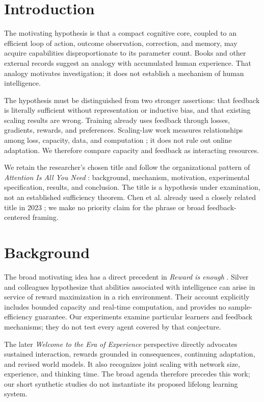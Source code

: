 \documentclass[11pt]{article}
\begin{document}
\section{Introduction}
The motivating hypothesis is that a compact cognitive core, coupled to an
efficient loop of action, outcome observation, correction, and memory, may
acquire capabilities disproportionate to its parameter count. Books and other
external records suggest an analogy with accumulated human experience. That
analogy motivates investigation; it does not establish a mechanism of human
intelligence.

The hypothesis must be distinguished from two stronger assertions: that
feedback is literally sufficient without representation or inductive bias,
and that existing scaling results are wrong. Training already uses feedback
through losses, gradients, rewards, and preferences. Scaling-law work measures
relationships among loss, capacity, data, and computation \cite{kaplan,hoffmann};
it does not rule out online adaptation. We therefore compare capacity and
feedback as interacting resources.

We retain the researcher's chosen title and follow the organizational pattern
of \emph{Attention Is All You Need} \cite{vaswani}: background, mechanism,
motivation, experimental specification, results, and conclusion. The title is
a hypothesis under examination, not an established sufficiency theorem.
Chen et al. already used a closely related title in 2023 \cite{chen}; we make
no priority claim for the phrase or broad feedback-centered framing.

\section{Background}
The broad motivating idea has a direct precedent in \emph{Reward is enough}
\cite{silver}. Silver and colleagues hypothesize that abilities associated with
intelligence can arise in service of reward maximization in a rich environment.
Their account explicitly includes bounded capacity and real-time computation,
and provides no sample-efficiency guarantee. Our experiments examine particular
learners and feedback mechanisms; they do not test every agent covered by that
conjecture.

The later \emph{Welcome to the Era of Experience} perspective \cite{experience}
directly advocates sustained interaction, rewards grounded in consequences,
continuing adaptation, and revised world models. It also recognizes joint
scaling with network size, experience, and thinking time. The broad agenda
therefore precedes this work; our short synthetic studies do not instantiate
its proposed lifelong learning system.
\end{document}
